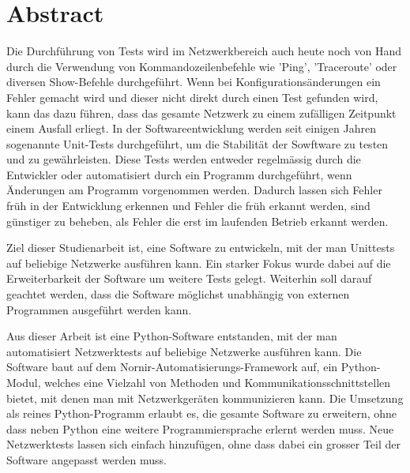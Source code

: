 \documentclass[]{subfiles}
\begin{document}
\section*{Abstract}
    Die Durchführung von Tests wird im Netzwerkbereich auch heute noch von Hand durch die Verwendung
    von Kommandozeilenbefehle wie 'Ping', 'Traceroute' oder diversen Show-Befehle durchgeführt.
    Wenn bei Konfigurationsänderungen ein Fehler gemacht wird und dieser nicht direkt durch
    einen Test gefunden wird, kann das dazu führen, dass das gesamte Netzwerk zu einem 
    zufälligen Zeitpunkt einem Ausfall erliegt.
    In der Softwareentwicklung werden seit einigen Jahren sogenannte Unit-Tests durchgeführt,
    um die Stabilität der Sowftware zu testen und zu gewährleisten.
    Diese Tests werden entweder regelmässig durch die Entwickler oder automatisiert durch
    ein Programm durchgeführt, wenn Änderungen am Programm vorgenommen werden.
    Dadurch lassen sich Fehler früh in der Entwicklung erkennen und Fehler die früh erkannt 
    werden, sind günstiger zu beheben, als Fehler die erst im laufenden Betrieb erkannt werden.

    Ziel dieser Studienarbeit ist, eine Software zu entwickeln, mit der man Unittests
    auf beliebige Netzwerke ausführen kann. 
    Ein starker Fokus wurde dabei auf die Erweiterbarkeit der Software um weitere Tests gelegt.
    Weiterhin soll darauf geachtet werden, dass die Software möglichst unabhängig von externen
    Programmen ausgeführt werden kann.

    Aus dieser Arbeit ist eine Python-Software entstanden, mit der man automatisiert Netzwerktests
    auf beliebige Netzwerke ausführen kann.
    Die Software baut auf dem Nornir-Automatisierungs-Framework auf, ein Python-Modul, welches
    eine Vielzahl von Methoden und Kommunikationsschnittstellen bietet, 
    mit denen man mit Netzwerkgeräten kommunizieren kann.
    Die Umsetzung als reines Python-Programm erlaubt es, die gesamte Software zu erweitern, 
    ohne dass neben Python eine weitere Programmiersprache erlernt werden muss.
    Neue Netzwerktests lassen sich einfach hinzufügen, ohne dass dabei ein grosser Teil der 
    Software angepasst werden muss.



    
\end{document}
